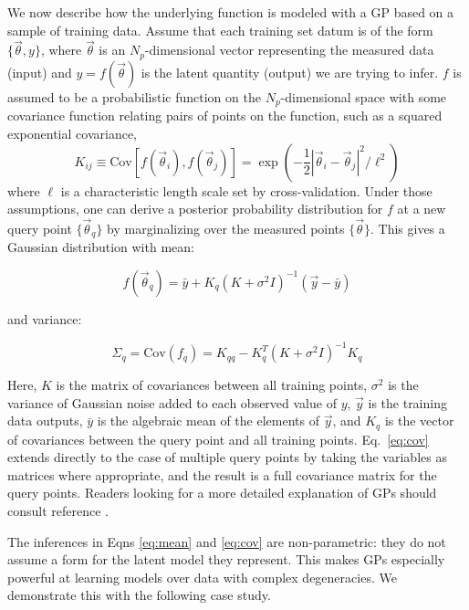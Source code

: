 \documentclass[prd,nofootbib,floatfix,11pt,tightenlines,nofootinbib]{revtex4}
\begin{document}
We now describe how the underlying function is modeled with a GP based on a
sample of training data.  Assume that each training set datum is of the
form $\{\vec{\theta},y\}$, where $\vec{\theta}$ is an $N_p$-dimensional
vector representing the measured data (input) and $y = f(\vec{\theta})$ is the
latent quantity (output) we are trying to infer.  $f$ is assumed to be a
probabilistic function on the $N_p$-dimensional space with some covariance
function relating pairs of points on the function, such as a squared
exponential covariance,
\begin{equation}
\label{eq:covariogram}
K_{ij}\equiv\text{Cov}\left[f(\vec{\theta}_{i}),f(\vec{\theta}_{j})\right]
= \exp(-\frac{1}{2}|\vec{\theta}_{i} - \vec{\theta}_{j}|^2/\ell^2)
\end{equation}
where $\ell$
is a characteristic length scale set by cross-validation.  
Under those
assumptions, one can derive a posterior probability distribution for $f$
at a new query point $\{\vec{\theta}_{q}\}$ by marginalizing over
the measured points $\{\vec{\theta}\}$.  This gives a Gaussian distribution
with mean:

\begin{equation}
f(\vec{\theta}_q)=\bar{y}+K_q\left(K+\sigma^2 I\right)^{-1}(\vec{y}-\bar{y})
\label{eq:mean}
\end{equation}

\noindent
and variance:

\begin{equation}
\Sigma_{q} = \text{Cov}(f_{q}) = K_{qq} - K_q^T (K + \sigma^2I)^{-1} K_q
\label{eq:cov}
\end{equation}

\noindent
Here, $K$ is the matrix of
covariances between all training points, $\sigma^2$ is the variance of
Gaussian noise added to each observed value of $y$, $\vec{y}$
is the training data outputs, $\bar{y}$ is the algebraic mean of the elements of
$\vec{y}$, and
$K_q$ is the vector of covariances between the query point and all
training points.  Eq.~\ref{eq:cov} extends directly to the case of multiple
query points by taking the variables as matrices where appropriate, and the
result is a full covariance matrix for the query points.  Readers looking
for a more detailed explanation of GPs should consult
reference \cite{gp}.


The inferences in Eqns \ref{eq:mean} and \ref{eq:cov} are non-parametric:
they do not assume a form for the latent model they represent.  This makes GPs
especially powerful at learning models over data
with complex degeneracies.  We demonstrate this with the following 
case study.
\end{document}
